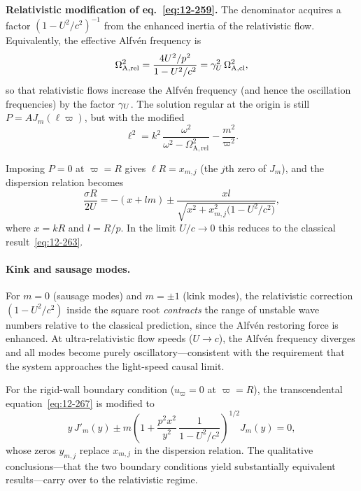 \begin{relcorrection}
\textbf{Relativistic modification of eq.~\eqref{eq:12-259}.}
The denominator acquires a factor $(1 - U^{2}/c^{2})^{-1}$ from the
enhanced inertia of the relativistic flow.  Equivalently, the effective
Alfv\'en frequency is
\begin{equation}
\label{eq:rel-113-Alfven-freq}
\Omega_{\mathrm{A,rel}}^{2}
  = \frac{4U^{2}/p^{2}}{1 - U^{2}/c^{2}}
  = \gamma_{U}^{2}\,\Omega_{\mathrm{A,cl}}^{2},
\end{equation}
so that relativistic flows increase the Alfv\'en frequency (and hence
the oscillation frequencies) by the factor $\gamma_{U}$.  The solution
regular at the origin is still $P = AJ_{m}(\ell\varpi)$, but with the
modified
\begin{equation}
\label{eq:rel-113-ell}
\ell^{2} = k^{2}\,
  \frac{\omega^{2}}
    {\omega^{2} - \Omega_{\mathrm{A,rel}}^{2}}
  - \frac{m^{2}}{\varpi^{2}}.
\end{equation}
\end{relcorrection}

Imposing $P = 0$ at $\varpi = R$ gives
$\ell R = x_{m,j}$ (the $j$th zero of $J_{m}$), and the dispersion
relation becomes
\begin{equation}
\label{eq:rel-113-sigma}
\frac{\sigma R}{2U}
  = -\!\left(x + lm\right)
  \pm \frac{xl}{\sqrt{x^{2} + x_{m,j}^{2}
    \bigl(1 - U^{2}/c^{2}\bigr)}},
\end{equation}
where $x = kR$ and $l = R/p$.  In the limit $U/c \to 0$ this
reduces to the classical result~\eqref{eq:12-263}.

\paragraph{Kink and sausage modes.}
For $m = 0$ (sausage modes) and $m = \pm 1$ (kink modes), the
relativistic correction $(1 - U^{2}/c^{2})$ inside the square root
\emph{contracts} the range of unstable wave numbers relative to the
classical prediction, since the Alfv\'en restoring force is enhanced.
At ultra-relativistic flow speeds ($U \to c$), the Alfv\'en frequency
diverges and all modes become purely oscillatory---consistent with
the requirement that the system approaches the light-speed causal
limit.

For the rigid-wall boundary condition ($u_{\varpi} = 0$ at
$\varpi = R$), the transcendental equation~\eqref{eq:12-267} is
modified to
\begin{equation}
\label{eq:rel-113-rigid}
y\,J'_{m}(y)
  \pm m\!\left(1 + \frac{p^{2}x^{2}}{y^{2}}\,
    \frac{1}{1-U^{2}/c^{2}}\right)^{\!1/2}\!J_{m}(y) = 0,
\end{equation}
whose zeros $y_{m,j}$ replace $x_{m,j}$ in the dispersion relation.
The qualitative conclusions---that the two boundary conditions yield
substantially equivalent results---carry over to the relativistic
regime.


